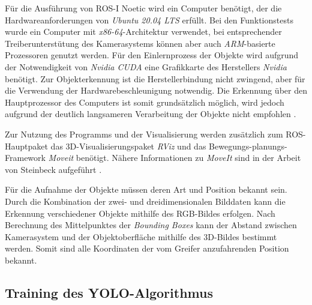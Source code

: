 
Für die Ausführung von \ac{ROS}-I Noetic wird ein Computer benötigt, der die Hardwareanforderungen von \textit{Ubuntu 20.04 LTS} erfüllt. Bei den Funktionstests wurde ein Computer mit \textit{x86-64}-Architektur verwendet, bei entsprechender Treiberunterstütung des Kamerasystems können aber auch \textit{ARM}-basierte Prozessoren genutzt werden. Für den Einlernprozess der Objekte  wird aufgrund der Notwendigkeit von \textit{Nvidia \ac{CUDA}} eine Grafikkarte des Herstellers \textit{Nvidia} benötigt. Zur Objekterkennung ist die Herstellerbindung nicht zwingend, aber für die Verwendung der Hardwarebeschleunigung notwendig. Die Erkennung über den Hauptprozessor des Computers ist somit grundsätzlich möglich, wird jedoch aufgrund der deutlich langsameren Verarbeitung der Objekte nicht empfohlen \cite{bjelonic_yolo_2016}.


Zur Nutzung des Programms und der Visualisierung werden zusätzlich zum \ac{ROS}-Hauptpaket das 3D-Visualisierungspaket \textit{RViz} \cite{ulisse_perusin_ros-visualizationrviz_2022} und das Bewegungs-planungs-Framework \textit{Moveit} \cite{ioan_a_sucan_moveit_nodate} benötigt. Nähere Informationen zu \textit{MoveIt} sind in der Arbeit von Steinbeck aufgeführt \cite[Abschnitt~3.2]{steinbeck_entwicklung_2022}.


Für die Aufnahme der Objekte müssen deren Art und Position bekannt sein. Durch die Kombination der zwei- und dreidimensionalen Bilddaten kann die Erkennung verschiedener Objekte mithilfe des RGB-Bildes erfolgen. Nach Berechnung des Mittelpunktes der \textit{Bounding Boxes} kann der Abstand zwischen Kamerasystem und der Objektoberfläche mithilfe des 3D-Bildes bestimmt werden. Somit sind alle Koordinaten der vom Greifer anzufahrenden Position bekannt.

\subsection{Training des YOLO-Algorithmus} \label{subsec:add_objects}

